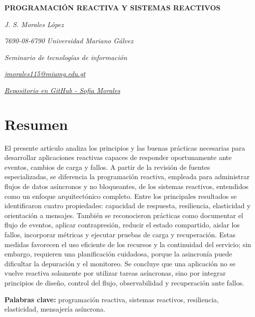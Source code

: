 \documentclass[12pt]{article}
\author{Jenny Sofía Morales}
\begin{document}
	
	\begin{center}
		
		{\bfseries\fontsize{12}{14}\selectfont
			PROGRAMACIÓN REACTIVA Y SISTEMAS REACTIVOS
		}
		
		\vspace{0.4cm}
		
		{\itshape J. S. Morales López}
		
		\vspace{0.2cm}
		
		{\itshape 7690-08-6790 Universidad Mariano Gálvez}
		
		{\itshape Seminario de tecnologías de información}
		
		{\itshape
			\href{mailto:jmorales115@miumg.edu.gt}
			{jmorales115@miumg.edu.gt}
		}
		
		{\itshape 
			\href{https://github.com/sofiaMorales3805/ForoAcademico-Seminario}
			{Repositorio en GitHub - Sofia Morales}
		}
	\end{center}
	
	\vspace{0.5cm}
	\section*{Resumen}
	
	El presente artículo analiza los principios y las buenas prácticas necesarias para desarrollar aplicaciones reactivas capaces de responder oportunamente ante eventos, cambios de carga y fallos. A partir de la revisión de fuentes especializadas, se diferencia la programación reactiva, empleada para administrar flujos de datos asíncronos y no bloqueantes, de los sistemas reactivos, entendidos como un enfoque arquitectónico completo. Entre los principales resultados se identificaron cuatro propiedades: capacidad de respuesta, resiliencia, elasticidad y orientación a mensajes. También se reconocieron prácticas como documentar el flujo de eventos, aplicar contrapresión, reducir el estado compartido, aislar los fallos, incorporar métricas y ejecutar pruebas de carga y recuperación. Estas medidas favorecen el uso eficiente de los recursos y la continuidad del servicio; sin embargo, requieren una planificación cuidadosa, porque la asincronía puede dificultar la depuración y el monitoreo. Se concluye que una aplicación no se vuelve reactiva solamente por utilizar tareas asíncronas, sino por integrar principios de diseño, control del flujo, observabilidad y recuperación ante fallos.
	
	
	\noindent
	\textbf{Palabras clave:} programación reactiva, sistemas reactivos, resiliencia, elasticidad, mensajería asíncrona.
	
\end{document}
